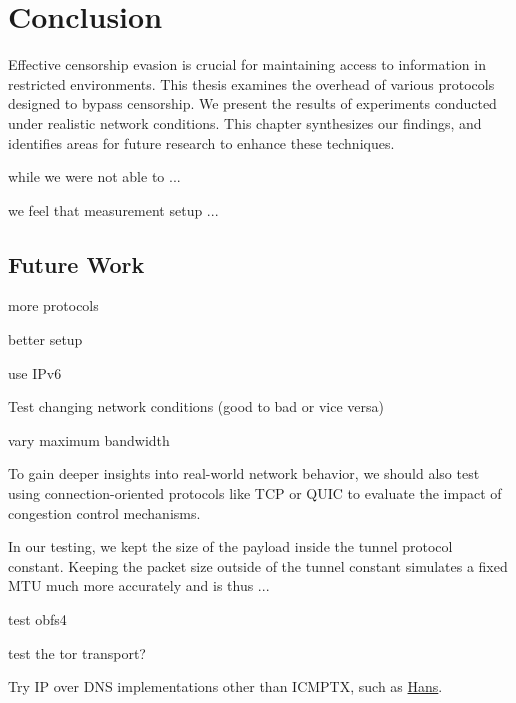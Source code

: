 
\chapter{Conclusion}
\label{chap:conclusion}

Effective censorship evasion is crucial for maintaining access to information in restricted environments.
This thesis examines the overhead of various protocols designed to bypass censorship.
We present the results of experiments conducted under realistic network conditions.
This chapter synthesizes our findings, and identifies areas for future research to enhance these techniques.


while we were not able to ...

we feel that measurement setup ...

\section{Future Work}
more protocols

better setup

use IPv6

Test changing network conditions (good to bad or vice versa)

vary maximum bandwidth

To gain deeper insights into real-world network behavior, we should also test using connection-oriented protocols like TCP or QUIC to evaluate the impact of congestion control mechanisms.

In our testing, we kept the size of the payload inside the tunnel protocol constant.
Keeping the packet size outside of the tunnel constant simulates a fixed MTU much more accurately and is thus ...

test obfs4

test the tor transport? 

Try IP over DNS implementations other than ICMPTX, such as \href{https://code.gerade.org/hans/}{Hans}.


